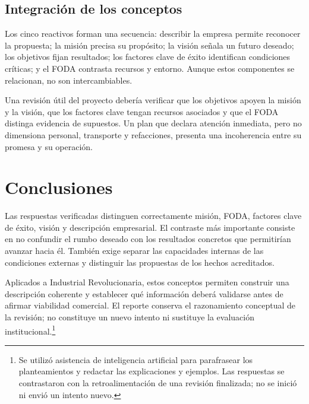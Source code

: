 {\subsection{Integración de los conceptos}

Los cinco reactivos forman una secuencia: describir la empresa permite reconocer la propuesta; la misión precisa su propósito; la visión señala un futuro deseado; los objetivos fijan resultados; los factores clave de éxito identifican condiciones críticas; y el FODA contrasta recursos y entorno. Aunque estos componentes se relacionan, no son intercambiables.

Una revisión útil del proyecto debería verificar que los objetivos apoyen la misión y la visión, que los factores clave tengan recursos asociados y que el FODA distinga evidencia de supuestos. Un plan que declara atención inmediata, pero no dimensiona personal, transporte y refacciones, presenta una incoherencia entre su promesa y su operación.

\section{Conclusiones}

Las respuestas verificadas distinguen correctamente misión, FODA, factores clave de éxito, visión y descripción empresarial. El contraste más importante consiste en no confundir el rumbo deseado con los resultados concretos que permitirían avanzar hacia él. También exige separar las capacidades internas de las condiciones externas y distinguir las propuestas de los hechos acreditados.

Aplicados a Industrial Revolucionaria, estos conceptos permiten construir una descripción coherente y establecer qué información deberá validarse antes de afirmar viabilidad comercial. El reporte conserva el razonamiento conceptual de la revisión; no constituye un nuevo intento ni sustituye la evaluación institucional.\footnote{Se utilizó asistencia de inteligencia artificial para parafrasear los planteamientos y redactar las explicaciones y ejemplos. Las respuestas se contrastaron con la retroalimentación de una revisión finalizada; no se inició ni envió un intento nuevo.}
}
